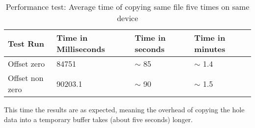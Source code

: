 \begin{table}[ht]
\caption{Performance test: Average time of copying same file five times on same device}
\centering
\begin{tabular}{|l|l|l|l|}
\hline\hline
\textbf{Test Run} & \textbf{Time in Milliseconds} & \textbf{Time in seconds} & \textbf{Time in minutes} \\ \hline
Offset zero & 84751 & $\sim$ 85 & $\sim$ 1.4 \\ \hline
Offset non zero & 90203.1 & $\sim$ 90 & $\sim$ 1.5 \\ \hline
\end{tabular}
\label{table:performance_test2}
\end{table}

This time the results are as expected, meaning the overhead of copying the hole data into a temporary buffer takes (about five seconds) longer.